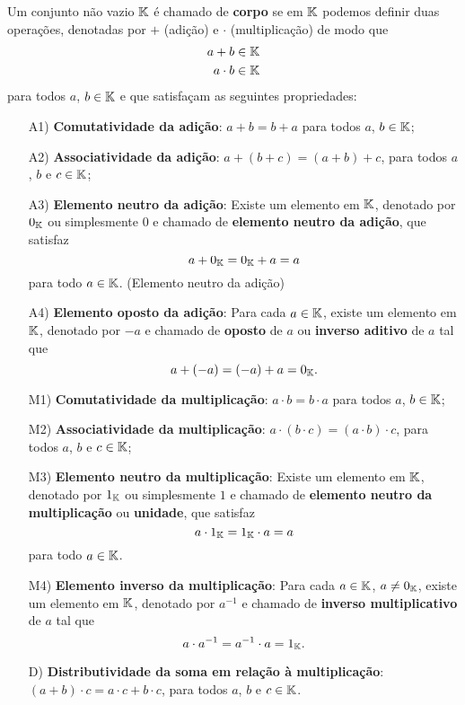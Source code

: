 \begin{definicao}
Um conjunto n\~ao vazio $\mathbb{K}$ \'e chamado de \textbf{corpo} se em $\mathbb{K}$ podemos definir duas opera\c{c}\~oes, denotadas por
$+$ (adi\c{c}\~ao) e $\cdot$ (multiplica\c{c}\~ao) de modo que
\begin{align*}
a + b \in \mathbb{K}\\
a \cdot b \in \mathbb{K}
\end{align*}
para todos $a$, $b \in \mathbb{K}$ e que satisfa\c{c}am as seguintes propriedades:
\begin{itemize}

	\item[A1)] \textbf{Comutatividade da adi\c{c}\~ao}: $a + b = b + a$ para todos $a$, $b \in \mathbb{K}$;
	\item[A2)] \textbf{Associatividade da adi\c{c}\~ao}: $a + (b + c) = (a + b) + c$, para todos $a$, $b$ e $c \in \mathbb{K}$;
	\item[A3)] \textbf{Elemento neutro da adi\c{c}\~ao}: Existe um elemento em $\mathbb{K}$, denotado por $0_{\mathbb{K}}$ ou simplesmente $0$ e chamado de \textbf{elemento neutro da adi\c{c}\~ao}, que satisfaz
	\[
	a + 0_{\mathbb{K}} = 0_{\mathbb{K}} + a = a
	\]
	para todo $a \in \mathbb{K}$. (Elemento neutro da adi\c{c}\~ao)
	\item[A4)] \textbf{Elemento oposto da adi\c{c}\~ao}: Para cada $a \in \mathbb{K}$, existe um elemento em $\mathbb{K}$, denotado por $-a$ e chamado de \textbf{oposto} de $a$ ou \textbf{inverso aditivo} de $a$ tal que
	\[
	a + (-a) = (-a) + a = 0_{\mathbb{K}}.
	\]
	\item[M1)] \textbf{Comutatividade da multiplica\c{c}\~ao}: $a \cdot b = b \cdot a$ para todos $a$, $b \in \mathbb{K}$;
	\item[M2)] \textbf{Associatividade da multiplica\c{c}\~ao}: $a \cdot (b \cdot c) = (a \cdot b) \cdot c$, para todos $a$, $b$ e $c \in \mathbb{K}$;
	\item[M3)] \textbf{Elemento neutro da multiplica\c{c}\~ao}: Existe um elemento em $\mathbb{K}$, denotado por $1_{\mathbb{K}}$ ou simplesmente $1$ e chamado de \textbf{elemento neutro da multiplica\c{c}\~ao} ou \textbf{unidade}, que satisfaz
	\[
	a \cdot 1_{\mathbb{K}} = 1_{\mathbb{K}} \cdot a = a
	\]
	para todo $a \in \mathbb{K}$.
	\item[M4)] \textbf{Elemento inverso da multiplica\c{c}\~ao}: Para cada $a \in \mathbb{K}$, $a \ne 0_{\mathbb{K}}$, existe um elemento em $\mathbb{K}$, denotado por $a^{-1}$ e chamado de \textbf{inverso multiplicativo} de $a$ 
	tal que
	\[
	a \cdot a^{-1} = a^{-1} \cdot a = 1_{\mathbb{K}}.
	\]
	\item[D)] \textbf{Distributividade da soma em rela\c{c}\~ao \`a multiplica\c{c}\~ao}: $(a + b)\cdot c = a\cdot c + b\cdot c$, para todos $a$, $b$ e $c \in \mathbb{K}$.
\end{itemize}
\end{definicao}

